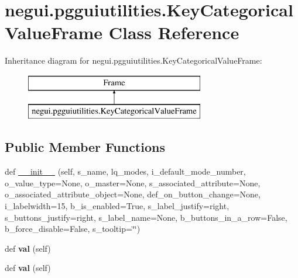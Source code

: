 \hypertarget{classnegui_1_1pgguiutilities_1_1KeyCategoricalValueFrame}{}\section{negui.\+pgguiutilities.\+Key\+Categorical\+Value\+Frame Class Reference}
\label{classnegui_1_1pgguiutilities_1_1KeyCategoricalValueFrame}
Inheritance diagram for negui.\+pgguiutilities.\+Key\+Categorical\+Value\+Frame\+:\begin{figure}[H]
\begin{center}
\leavevmode
\includegraphics[height=2.000000cm]{classnegui_1_1pgguiutilities_1_1KeyCategoricalValueFrame}
\end{center}
\end{figure}
\subsection*{Public Member Functions}
\begin{DoxyCompactItemize}
\item 
def \hyperlink{classnegui_1_1pgguiutilities_1_1KeyCategoricalValueFrame_a8a88953e8615374aaddbb4347320e79c}{\+\_\+\+\_\+init\+\_\+\+\_\+} (self, s\+\_\+name, lq\+\_\+modes, i\+\_\+default\+\_\+mode\+\_\+number, o\+\_\+value\+\_\+type=None, o\+\_\+master=None, s\+\_\+associated\+\_\+attribute=None, o\+\_\+associated\+\_\+attribute\+\_\+object=None, def\+\_\+on\+\_\+button\+\_\+change=None, i\+\_\+labelwidth=15, b\+\_\+is\+\_\+enabled=True, s\+\_\+label\+\_\+justify=\textquotesingle{}right\textquotesingle{}, s\+\_\+buttons\+\_\+justify=\textquotesingle{}right\textquotesingle{}, s\+\_\+label\+\_\+name=None, b\+\_\+buttons\+\_\+in\+\_\+a\+\_\+row=False, b\+\_\+force\+\_\+disable=False, s\+\_\+tooltip=\char`\"{}\char`\"{})
\item 
def {\bfseries val} (self)\hypertarget{classnegui_1_1pgguiutilities_1_1KeyCategoricalValueFrame_a5d86db393ee3cf1e974f063a75b64b22}{}\label{classnegui_1_1pgguiutilities_1_1KeyCategoricalValueFrame_a5d86db393ee3cf1e974f063a75b64b22}

\item 
def {\bfseries val} (self)\hypertarget{classnegui_1_1pgguiutilities_1_1KeyCategoricalValueFrame_a5d86db393ee3cf1e974f063a75b64b22}{}\label{classnegui_1_1pgguiutilities_1_1KeyCategoricalValueFrame_a5d86db393ee3cf1e974f063a75b64b22}

\end{DoxyCompactItemize}



